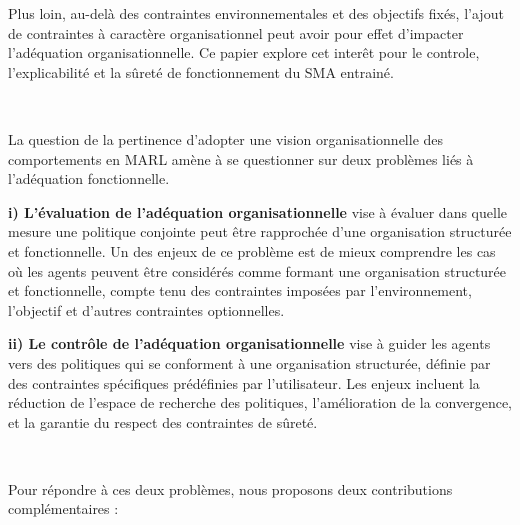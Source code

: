 \documentclass[sigconf,anonymous]{aamas}
\begin{document}
Plus loin, au-delà des contraintes environnementales et des objectifs fixés, l'ajout de contraintes à caractère organisationnel peut avoir pour effet d'impacter l'adéquation organisationnelle. Ce papier explore cet interêt pour le controle, l'explicabilité et la sûreté de fonctionnement du SMA entrainé.

\

\noindent La question de la pertinence d'adopter une vision organisationnelle des comportements en MARL amène à se questionner sur deux problèmes liés à l'adéquation fonctionnelle.

\quad \textbf{i) L'évaluation de l'adéquation organisationnelle} vise à évaluer dans quelle mesure une politique conjointe peut être rapprochée d'une organisation structurée et fonctionnelle. Un des enjeux de ce problème est de mieux comprendre les cas où les agents peuvent être considérés comme formant une organisation structurée et fonctionnelle, compte tenu des contraintes imposées par l'environnement, l'objectif et d'autres contraintes optionnelles.

\quad \textbf{ii) Le contrôle de l'adéquation organisationnelle} vise à guider les agents vers des politiques qui se conforment à une organisation structurée, définie par des contraintes spécifiques prédéfinies par l'utilisateur.
Les enjeux incluent la réduction de l'espace de recherche des politiques, l'amélioration de la convergence, et la garantie du respect des contraintes de sûreté.

\

\noindent Pour répondre à ces deux problèmes, nous proposons deux contributions complémentaires :
\end{document}
